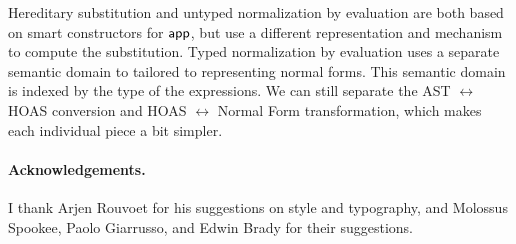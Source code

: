 Hereditary substitution and untyped normalization by evaluation are both based on smart constructors for $\mathsf{app}$,
but use a different representation and mechanism to compute the substitution.
Typed normalization by evaluation uses a separate semantic domain to tailored to representing normal forms.
This semantic domain is indexed by the type of the expressions.
We can still separate the AST $\leftrightarrow$ HOAS conversion and HOAS $\leftrightarrow$ Normal Form transformation, which makes each individual piece a bit simpler.

\paragraph{Acknowledgements.} I thank Arjen Rouvoet for his suggestions on style and typography,
and Molossus Spookee, Paolo Giarrusso, and Edwin Brady for their suggestions.





